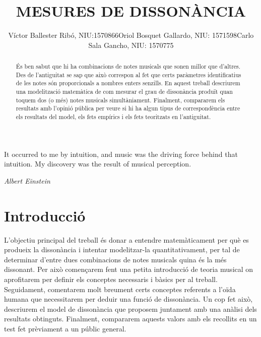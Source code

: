 \documentclass{article}
\title{\bfseries\large MESURES DE DISSONÀNCIA}
\author{Víctor Ballester Ribó, NIU:1570866\endgraf Oriol Bosquet Gallardo, NIU: 1571598\endgraf Carlo Sala Gancho, NIU: 1570775}
\date{\parbox{\linewidth}{\centering
  Taller de modelització\endgraf
  Grau en Matemàtiques\endgraf
  Universitat Autònoma de Barcelona\endgraf
  Juny de 2021}}
\theoremstyle{math}
\theoremstyle{TheoremNum}
\newcommand{\0}{\ensuremath{\vb{0}}}
\begin{document}
\maketitle
{}
\begin{abstract}
    \noindent És ben sabut que hi ha combinacions de notes musicals que sonen millor que d'altres. Des de l'antiguitat se sap que això correspon al fet que certs paràmetres identificatius de les notes són proporcionals a nombres enters senzills. En aquest treball descriurem una modelització matemàtica de com mesurar el grau de dissonància produït quan toquem dos (o més) notes musicals simultàniament. Finalment, compararem els resultats amb l'opinió pública per veure si hi ha algun tipus de correspondència entre els resultats del model, els fets empírics i els fets teoritzats en l'antiguitat. 
\end{abstract}
\thispagestyle{empty}
\newpage
\thispagestyle{empty}
\vspace*{\fill}
\vspace{-2cm}
\epigraph{It occurred to me by intuition, and music was the driving force behind that intuition. My discovery was the result of musical perception.}{\textit{Albert Einstein}}
\vspace*{\fill}
\newpage
{}
\setcounter{page}{1}
\tableofcontents
\newpage
\section{Introducció}
L'objectiu principal del treball és donar a entendre matemàticament per què es produeix la dissonància i intentar modelitzar-la quantitativament, per tal de determinar d'entre dues combinacions de notes musicals quina és la més dissonant. Per això començarem fent una petita introducció de teoria musical on aprofitarem per definir els conceptes necessaris i bàsics per al treball. Seguidament, comentarem molt breument certs conceptes referents a l'oïda humana que necessitarem per deduir una funció de dissonància. Un cop fet això, descriurem el model de dissonància que proposem juntament amb una anàlisi dels resultats obtinguts. Finalment, compararem aquests valors amb els recollits en un test fet prèviament a un públic general.
\end{document}

